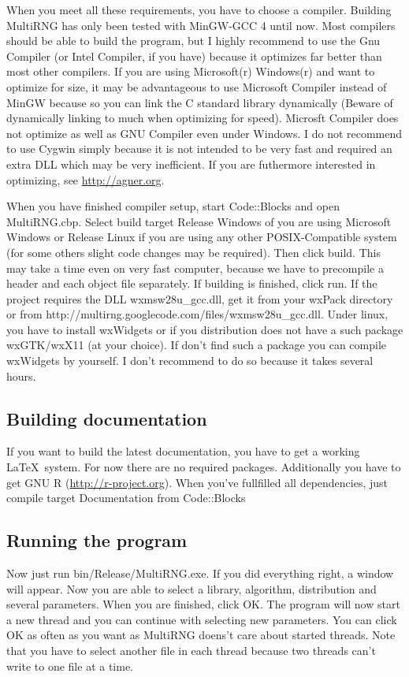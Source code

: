 \documentclass{scrartcl}
\begin{document}
When you meet all these requirements, you have to choose a compiler. Building MultiRNG has only been tested with MinGW-GCC 4 until now. Most compilers should be able to build the program, but I highly recommend to use the Gnu Compiler (or Intel Compiler, if you have) because it optimizes far better than most other compilers. If you are using Microsoft(r) Windows(r) and want to optimize for size, it may be advantageous to use Microsoft Compiler instead of MinGW because so you can link the C standard library dynamically (Beware of dynamically linking to much when optimizing for speed). Microsft Compiler does not optimize as well as GNU Compiler even under Windows. I do not recommend to use Cygwin simply because it is not intended to be very fast and required an extra DLL which may be very inefficient. If you are futhermore interested in optimizing, see \url{http://agner.org}.\newline

When you have finished compiler setup, start Code::Blocks and open MultiRNG.cbp. Select build target Release Windows of you are using Microsoft Windows or Release Linux if you are using any other POSIX-Compatible system (for some others slight code changes may be required). Then click build. This may take a time even on very fast computer, because we have to precompile a header and each object file separately. If building is finished, click run. If the project requires the DLL wxmsw28u\_gcc.dll, get it from your wxPack directory or from http://multirng.googlecode.com/files/wxmsw28u\_gcc.dll. Under linux, you have to install wxWidgets or if you distribution does not have a such package wxGTK/wxX11 (at your choice). If don't find such a package you can compile wxWidgets by yourself. I don't recommend to do so because it takes several hours.

\subsection{Building documentation}
If you want to build the latest documentation, you have to get a working \LaTeX\ system. For now there are no required packages. Additionally you have to get GNU R (\url{http://r-project.org}). When you've fullfilled all dependencies, just compile target Documentation from Code::Blocks

\subsection{Running the program}
Now just run bin/Release/MultiRNG.exe. If you did everything right, a window will appear. Now you are able to select a library, algorithm, distribution and several parameters. When you are finished, click OK. The program will now start a new thread and you can continue with selecting new parameters. You can click OK as often as you want as MultiRNG doens't care about started threads. Note that you have to select another file in each thread because two threads can't write to one file at a time.
\end{document}
